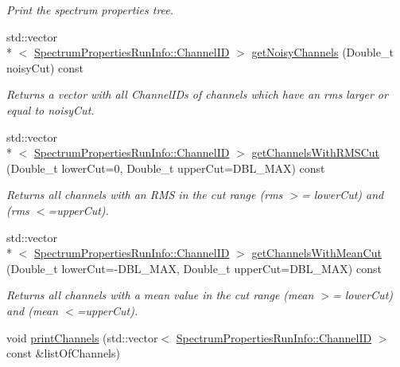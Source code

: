 \begin{DoxyCompactItemize}
\begin{DoxyCompactList}\small\item\em Print the spectrum properties tree. \end{DoxyCompactList}\item 
std\-::vector\\*
$<$ \hyperlink{class_spectrum_properties_run_info_1_1_channel_i_d}{Spectrum\-Properties\-Run\-Info\-::\-Channel\-I\-D} $>$ \hyperlink{class_spectrum_properties_run_info_a224a09a5da8dd40b3b368ce11811a816}{get\-Noisy\-Channels} (Double\-\_\-t noisy\-Cut) const 
\begin{DoxyCompactList}\small\item\em Returns a vector with all Channel\-I\-Ds of channels which have an rms larger or equal to {\ttfamily noisy\-Cut}. \end{DoxyCompactList}\item 
std\-::vector\\*
$<$ \hyperlink{class_spectrum_properties_run_info_1_1_channel_i_d}{Spectrum\-Properties\-Run\-Info\-::\-Channel\-I\-D} $>$ \hyperlink{class_spectrum_properties_run_info_aa2d88f63b3ea5d414bbe98708689a706}{get\-Channels\-With\-R\-M\-S\-Cut} (Double\-\_\-t lower\-Cut=0, Double\-\_\-t upper\-Cut=D\-B\-L\-\_\-\-M\-A\-X) const 
\begin{DoxyCompactList}\small\item\em Returns all channels with an R\-M\-S in the cut range (rms $>$= lower\-Cut) and (rms $<$=upper\-Cut). \end{DoxyCompactList}\item 
std\-::vector\\*
$<$ \hyperlink{class_spectrum_properties_run_info_1_1_channel_i_d}{Spectrum\-Properties\-Run\-Info\-::\-Channel\-I\-D} $>$ \hyperlink{class_spectrum_properties_run_info_a29a7ddfe9965e36250ea137b9b981496}{get\-Channels\-With\-Mean\-Cut} (Double\-\_\-t lower\-Cut=-\/D\-B\-L\-\_\-\-M\-A\-X, Double\-\_\-t upper\-Cut=D\-B\-L\-\_\-\-M\-A\-X) const 
\begin{DoxyCompactList}\small\item\em Returns all channels with a mean value in the cut range (mean $>$= lower\-Cut) and (mean $<$=upper\-Cut). \end{DoxyCompactList}\item 
void \hyperlink{class_spectrum_properties_run_info_aae84c9751a720ce8ec1fa702b54713d1}{print\-Channels} (std\-::vector$<$ \hyperlink{class_spectrum_properties_run_info_1_1_channel_i_d}{Spectrum\-Properties\-Run\-Info\-::\-Channel\-I\-D} $>$ const \&list\-Of\-Channels)

\end{DoxyCompactItemize}
